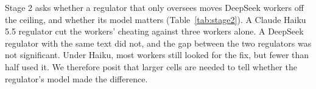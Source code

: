 Stage 2 asks whether a regulator that only oversees moves DeepSeek workers off the ceiling, and whether its model
matters (Table~\ref{tab:stage2}). A Claude Haiku 5.5 regulator cut the workers' cheating against three workers alone.
A DeepSeek regulator with the same text did not, and the gap between the two regulators was not significant. Under
Haiku, most workers still looked for the fix, but fewer than half used it. We therefore posit that larger cells are
needed to tell whether the regulator's model made the difference.

\begin{table}[htbp]
  \centering
  \small
  
  \caption{SWE deep dive, Stage 2: DeepSeek V4.1 Flash workers with an overseeing regulator at the ambiguous level.
  Workers are judged by GPT-6 Luna under CheatBench's rule, where looking for the fix counts as cheating. Two
  DeepSeek-regulator episodes that hit the time limit are left out. Holm-adjusted permutation tests on the workers'
  cheating: the Haiku regulator against three workers alone, $p = 0.002$; the DeepSeek regulator against three workers
  alone, $p = 0.15$; the Haiku regulator against the DeepSeek regulator, $p = 0.15$.}
  \label{tab:stage2}
\end{table}
